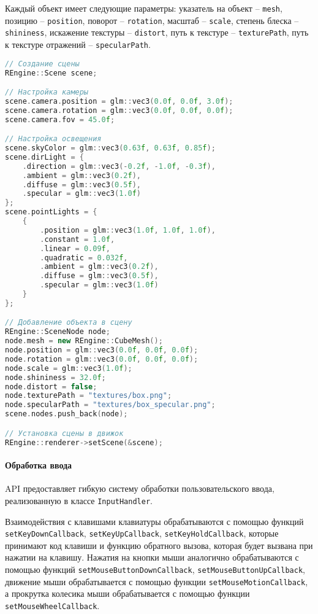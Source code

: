 Каждый объект имеет следующие параметры: указатель на объект -- \texttt{mesh}, позицию -- \texttt{position}, поворот -- \texttt{rotation}, масштаб -- \texttt{scale}, степень блеска -- \texttt{shininess}, искажение текстуры -- \texttt{distort}, путь к текстуре -- \texttt{texturePath}, путь к текстуре отражений -- \texttt{specularPath}.

\begin{lstlisting}[language=C++, caption=Пример работы со сценой]
// Создание сцены
REngine::Scene scene;

// Настройка камеры
scene.camera.position = glm::vec3(0.0f, 0.0f, 3.0f);
scene.camera.rotation = glm::vec3(0.0f, 0.0f, 0.0f);
scene.camera.fov = 45.0f;

// Настройка освещения
scene.skyColor = glm::vec3(0.63f, 0.63f, 0.85f);
scene.dirLight = {
    .direction = glm::vec3(-0.2f, -1.0f, -0.3f),
    .ambient = glm::vec3(0.2f),
    .diffuse = glm::vec3(0.5f),
    .specular = glm::vec3(1.0f)
};
scene.pointLights = {
    {
        .position = glm::vec3(1.0f, 1.0f, 1.0f),
        .constant = 1.0f,
        .linear = 0.09f,
        .quadratic = 0.032f,
        .ambient = glm::vec3(0.2f),
        .diffuse = glm::vec3(0.5f),
        .specular = glm::vec3(1.0f)
    }
};

// Добавление объекта в сцену
REngine::SceneNode node;
node.mesh = new REngine::CubeMesh();
node.position = glm::vec3(0.0f, 0.0f, 0.0f);
node.rotation = glm::vec3(0.0f, 0.0f, 0.0f);
node.scale = glm::vec3(1.0f);
node.shininess = 32.0f;
node.distort = false;
node.texturePath = "textures/box.png";
node.specularPath = "textures/box_specular.png";
scene.nodes.push_back(node);

// Установка сцены в движок
REngine::renderer->setScene(&scene);
\end{lstlisting}

\paragraph{Обработка ввода}

API предоставляет гибкую систему обработки пользовательского ввода, реализованную в классе \texttt{InputHandler}.

Взаимодействия с клавишами клавиатуры обрабатываются с помощью функций \texttt{setKeyDownCallback}, \texttt{setKeyUpCallback}, \texttt{setKeyHoldCallback}, которые принимают код клавиши и функцию обратного вызова, которая будет вызвана при нажатии на клавишу. Нажатия на кнопки мыши аналогично обрабатываются с помощью функций \texttt{setMouseButtonDownCallback}, \texttt{setMouseButtonUpCallback}, движение мыши обрабатывается с помощью функции \texttt{setMouseMotionCallback}, а прокрутка колесика мыши обрабатывается с помощью функции \texttt{setMouseWheelCallback}.


